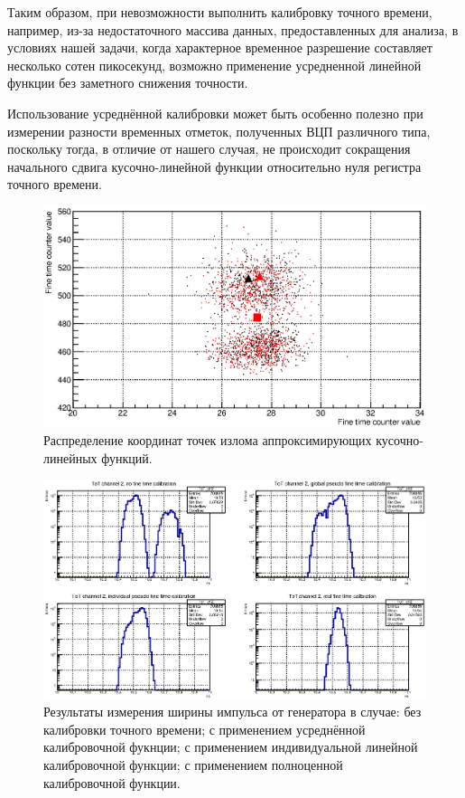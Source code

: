 Таким образом, при невозможности выполнить калибровку точного времени, например, из-за недостаточного массива данных, предоставленных для анализа, в условиях нашей задачи, когда характерное временное разрешение составляет несколько сотен пикосекунд, возможно применение усредненной линейной функции без заметного снижения точности.

Использование усреднённой калибровки может быть особенно полезно при измерении разности временных отметок, полученных ВЦП различного типа, поскольку тогда, в отличие от нашего случая, не происходит сокращения начального сдвига кусочно-линейной функции относительно нуля регистра точного времени.

\begin{figure}
\includegraphics[width=1.0\textwidth]{pictures/ABmap.eps}
\caption{Распределение координат точек излома аппроксимирующих кусочно-линейных функций.}
\label{fig:ABmap}
\end{figure}

\begin{figure}
\includegraphics[width=1.0\textwidth]{pictures/ToT_ch2.eps}
\caption{Результаты измерения ширины импульса от генератора в случае: без калибровки точного времени; с применением усреднённой калибровочной фукнции; с применением индивидуальной линейной калибровочной функции; с применением полноценной калибровочной функции.}
\label{fig:FourToT}
\end{figure}

